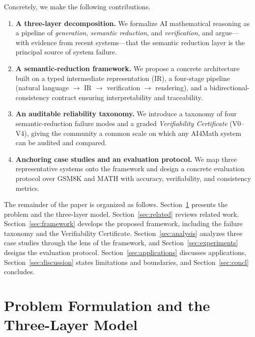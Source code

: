 \documentclass[11pt,a4paper]{article}
\theoremstyle{definition}
\theoremstyle{plain}
\begin{document}
Concretely, we make the following contributions.
\begin{enumerate}[leftmargin=*]
  \item \textbf{A three-layer decomposition.} We formalize AI mathematical reasoning as a pipeline of
  \emph{generation}, \emph{semantic reduction}, and \emph{verification}, and argue---with evidence from
  recent systems---that the semantic reduction layer is the principal source of system failure.
  \item \textbf{A semantic-reduction framework.} We propose a concrete architecture built on a typed
  intermediate representation (IR), a four-stage pipeline
  (natural language $\rightarrow$ IR $\rightarrow$ verification $\rightarrow$ rendering), and a
  bidirectional-consistency contract ensuring interpretability and traceability.
  \item \textbf{An auditable reliability taxonomy.} We introduce a taxonomy of four semantic-reduction
  failure modes and a graded \emph{Verifiability Certificate} (V0--V4), giving the community a common
  scale on which any AI4Math system can be audited and compared.
  \item \textbf{Anchoring case studies and an evaluation protocol.} We map three representative systems
  onto the framework and design a concrete evaluation protocol over GSM8K and MATH with
  accuracy, verifiability, and consistency metrics.
\end{enumerate}

The remainder of the paper is organized as follows. Section~\ref{sec:model} presents the problem and the
three-layer model. Section~\ref{sec:related} reviews related work. Section~\ref{sec:framework} develops
the proposed framework, including the failure taxonomy and the Verifiability Certificate.
Section~\ref{sec:analysis} analyzes three case studies through the lens of the framework, and
Section~\ref{sec:experiments} designs the evaluation protocol. Section~\ref{sec:applications} discusses
applications, Section~\ref{sec:discussion} states limitations and boundaries, and Section~\ref{sec:concl}
concludes.

\section{Problem Formulation and the Three-Layer Model}
\label{sec:model}
\end{document}
